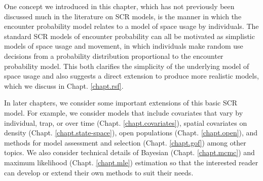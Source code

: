 {One concept we introduced in this chapter, which has not
previously been discussed much in the literature on SCR models,
is the manner in which the encounter probability model relates to a
model of space usage by individuals. The standard SCR models of
encounter probability can all be motivated as simplistic models of
space usage and movement, in which individuals make random use
decisions from a probability distribution proportional to the
encounter probability model. This both clarifies the simplicity of the
underlying model of space usage and also suggests a direct extension
to produce more realistic models, which we discuss in
Chapt. \ref{chapt.rsf}.


In later chapters, we consider some important extensions of this basic
SCR model.  For example, we consider models that include covariates
that vary by individual, trap, or over time (Chapt.
\ref{chapt.covariates}), spatial covariates on density (Chapt.
\ref{chapt.state-space}), open populations (Chapt. \ref{chapt.open}),
and methods for model assessment and selection
(Chapt. \ref{chapt.gof}) among other topics.  We also consider
technical details of Bayesian (Chapt.  \ref{chapt.mcmc}) and maximum
likelihood (Chapt.  \ref{chapt.mle}) estimation so that the interested
reader can develop or extend their own methods to suit their needs.


}
